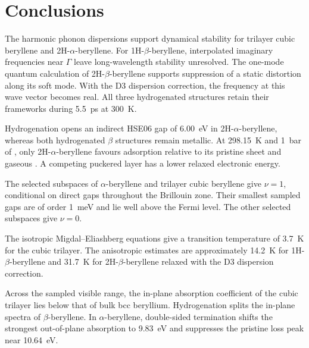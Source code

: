 \FloatBarrier
\section{Conclusions}
\label{3_conclusions}

The harmonic phonon dispersions support dynamical stability for trilayer cubic beryllene and 2H-$\alpha$-beryllene.
For 1H-$\beta$-beryllene, interpolated imaginary frequencies near $\Gamma$ leave long-wavelength stability unresolved.
The one-mode quantum calculation of 2H-$\beta$-beryllene supports suppression of a static distortion along its soft mode.
With the D3 dispersion correction, the frequency at this wave vector becomes real.
All three hydrogenated structures retain their frameworks during \qty{5.5}{\pico\second} at \qty{300}{\kelvin}.

Hydrogenation opens an indirect HSE06 gap of \qty{6.00}{\electronvolt} in 2H-$\alpha$-beryllene, whereas both hydrogenated $\beta$ structures remain metallic.
At \qty{298.15}{\kelvin} and \qty{1}{\bar} of , only 2H-$\alpha$-beryllene favours adsorption relative to its pristine sheet and gaseous .
A competing puckered  layer has a lower relaxed electronic energy.

The selected subspaces of $\alpha$-beryllene and trilayer cubic beryllene give $\nu=1$, conditional on direct gaps throughout the Brillouin zone.
Their smallest sampled gaps are of order \qty{1}{\milli\electronvolt} and lie well above the Fermi level.
The other selected subspaces give $\nu=0$.

The isotropic Migdal--Eliashberg equations give a transition temperature of \qty{3.7}{\kelvin} for the cubic trilayer.
The anisotropic estimates are approximately \qty{14.2}{\kelvin} for 1H-$\beta$-beryllene and \qty{31.7}{\kelvin} for 2H-$\beta$-beryllene relaxed with the D3 dispersion correction.

Across the sampled visible range, the in-plane absorption coefficient of the cubic trilayer lies below that of bulk bcc beryllium.
Hydrogenation splits the in-plane spectra of $\beta$-beryllene.
In $\alpha$-beryllene, double-sided termination shifts the strongest out-of-plane absorption to \qty{9.83}{\electronvolt} and suppresses the pristine loss peak near \qty{10.64}{\electronvolt}.
